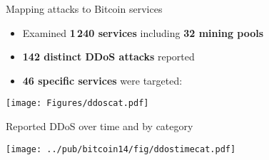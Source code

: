 \documentclass{beamer}
\begin{document}
\begin{frame}{Mapping attacks to Bitcoin services}
\begin{itemize}
          \item Examined \textbf{1\,240 services} including \textbf{32 mining pools}
	\item \textbf{142 distinct DDoS attacks} reported
	\item \textbf{46 specific services} were targeted:
\end{itemize}
\begin{center}
\texttt{[image: Figures/ddoscat.pdf]}
\end{center}
\end{frame}



\begin{frame}{Reported DDoS over time and by category}
\begin{center}
\vspace*{-4em}
\texttt{[image: ../pub/bitcoin14/fig/ddostimecat.pdf]}
\end{center}
\end{frame}

\end{document}
